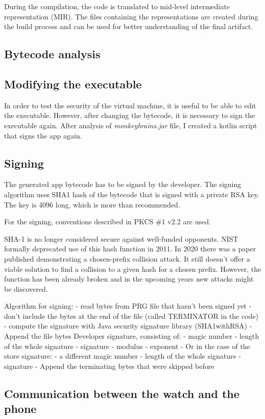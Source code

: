 During the compilation, the code is translated to mid-level intermediate representation (MIR).
The files containing the representations are created during the build process and can be used for better understanding of the final artifact.
\subsection{Bytecode analysis}
\subsection{Modifying the executable}
In order to test the security of the virtual machine, it is useful to be able to edit the executable.
However, after changing the bytecode, it is necessary to sign the executable again.
After analysis of \textit{monkeybrains.jar} file, I created a kotlin script that signs the app again.
\subsection{Signing}
The generated app bytecode has to be signed by the developer.
The signing algorithm uses SHA1 hash of the bytecode that is signed with a private RSA key.
The key is 4096 long, which is more than recommended.

For the signing, conventions described in PKCS \#1 v2.2 are used.

SHA-1 is no longer considered secure against well-funded opponents.
NIST formally deprecated use of this hash function in 2011.
In 2020 there was a paper published demonstrating a chosen-prefix collision attack.
It still doesn't offer a viable solution to find a collision to a given hash for a chosen prefix.
However, the function has been already broken and in the upcoming years new attacks might be discovered.

Algorithm for signing:
- read bytes from PRG file that hasn't been signed yet
- don't include the bytes at the end of the file (called TERMINATOR in the code)
- compute the signature with Java security signature library (SHA1withRSA)
- Append the file bytes Developer signature, consisting of:
- magic number
- length of the whole signature
- signature
- modulus
- exponent
- Or in the case of the store signature:
- a different magic number
- length of the whole signature
- signature
- Append the terminating bytes that were skipped before

\subsection{Communication between the watch and the phone} \label{subsec:communication-watch-phone}

